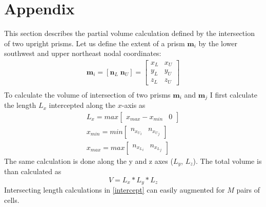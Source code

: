 

\chapter*{Appendix}\label{AppendixA}

This section describes the partial volume calculation defined by the intersection of two upright prisms.
Let us define the extent of a prism $\mathbf{m}_i$ by the lower southwest and upper northeast nodal coordinates:
\begin{equation}\tag{A.1}
\begin{split}
\mathbf{m}_i = [\mathbf{n}_L\; \mathbf{n}_U] = \begin{bmatrix} x_{L} & x_{U} \\ y_{L}& y_{U} \\ z_{L} & z_{U} \end{bmatrix}\\
\end{split}
\end{equation}
To calculate the volume of intersection of two prisms $\mathbf{m}_i$ and $\mathbf{m}_j$ I first calculate the length $L_x$ intercepted along the $x$-axis as 
\begin{equation}\tag{A.2}\label{intercept}
\begin{split} 
L_x = max\begin{bmatrix} x_{max} - x_{min} & 0\end{bmatrix}\\
x_{min} = min\begin{bmatrix} n_{{x_U}_i} & n_{{x_U}_j} \end{bmatrix}\\
x_{max} = max\begin{bmatrix} n_{{x_L}_i} & n_{{x_L}_j} \end{bmatrix} 
\end{split}
\end{equation}
The same calculation is done along the y and z axes ($L_y$, $L_z$).
The total volume is than calculated as
\begin{equation}\tag{A.3}
V = L_x* L_y * L_z
\end{equation}
Intersecting length calculations in \eqref{intercept} can easily augmented for $M$ pairs of cells.
